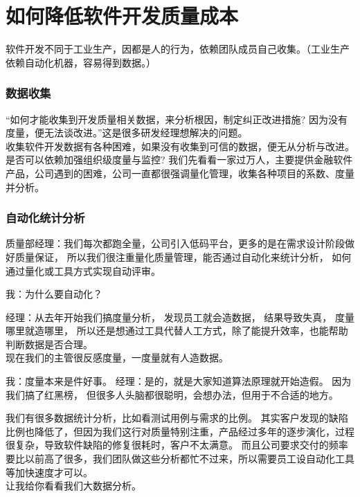 \chapter{如何降低软件开发质量成本} %

软件开发不同于工业生产，因都是人的行为，依赖团队成员自己收集。（工业生产依赖自动化机器，容易得到数据。）

\hypertarget{ux6570ux636eux6536ux96c6}{%
\subsection{数据收集}\label{ux6570ux636eux6536ux96c6}}

``如何才能收集到开发质量相关数据，来分析根因，制定纠正改进措施?
因为没有度量，便无法谈改进。''这是很多研发经理想解决的问题。\\
收集软件开发数据有各种困难，如果没有收集到可信的数据，便无从分析与改进。\\
是否可以依赖加强组织级度量与监控?
我们先看看一家过万人，主要提供金融软件产品，公司遇到的困难，公司一直都很强调量化管理，收集各种项目的系数、度量并分析。\\

\hypertarget{ux81eaux52a8ux5316ux7edfux8ba1ux5206ux6790}{%
\subsection{自动化统计分析}\label{ux81eaux52a8ux5316ux7edfux8ba1ux5206ux6790}}

质量部经理：我们每次都跑全量，公司引入低码平台，更多的是在需求设计阶段做好质量保证，
所以我们很注重量化质量管理，能否通过自动化来统计分析，
如何通过量化或工具方式实现自动评审。

我：为什么要自动化？

经理：从去年开始我们搞度量分析， 发现员工就会造数据， 结果导致失真，
度量哪里就造哪里，
所以还是想通过工具代替人工方式，除了能提升效率，也能帮助判断数据是否合理。\\
现在我们的主管很反感度量，一度量就有人造数据。

我：度量本来是件好事。 经理：是的，就是大家知道算法原理就开始造假。
因为我们搞了红黑榜，
但很多人头脑都很聪明，会想办法，但用于不合适的地方。

我们有很多数据统计分析，比如看测试用例与需求的比例。
其实客户发现的缺陷比例也降低了，但因为我们这行对质量特别注重，产品经过多年的逐步演化，过程很复杂，导致软件缺陷的修复很耗时，客户不太满意。
而且公司要求交付的频率要比以前高了很多，我们团队做这些分析都忙不过来，所以需要员工设自动化工具等加快速度才可以。\\
让我给你看看我们大数据分析。

